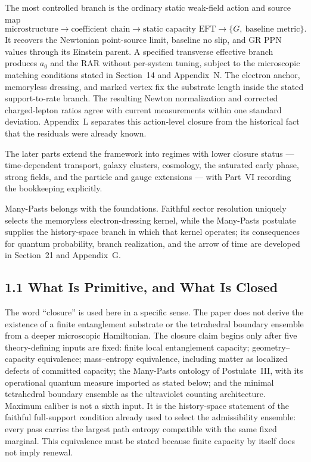 \documentclass[11pt]{article}
\begin{document}
The most controlled branch is the ordinary static weak-field action and source map
\[
\text{microstructure} \longrightarrow \text{coefficient chain} \longrightarrow \text{static capacity EFT} \longrightarrow \{G,\ \text{baseline metric}\}.
\]
It recovers the Newtonian point-source limit, baseline no slip, and GR PPN values through its Einstein parent. A specified transverse effective branch produces $a_0$ and the RAR without per-system tuning, subject to the microscopic matching conditions stated in Section~14 and Appendix~N. The electron anchor, memoryless dressing, and marked vertex fix the substrate length inside the stated support-to-rate branch. The resulting Newton normalization and corrected charged-lepton ratios agree with current measurements within one standard deviation. Appendix~L separates this action-level closure from the historical fact that the residuals were already known.

The later parts extend the framework into regimes with lower closure status --- time-dependent transport, galaxy clusters, cosmology, the saturated early phase, strong fields, and the particle and gauge extensions --- with Part~VI recording the bookkeeping explicitly.

Many-Pasts belongs with the foundations. Faithful sector resolution uniquely selects the memoryless electron-dressing kernel, while the Many-Pasts postulate supplies the history-space branch in which that kernel operates; its consequences for quantum probability, branch realization, and the arrow of time are developed in Section~21 and Appendix~G.

\subsection{1.1 What Is Primitive, and What Is Closed}

The word ``closure'' is used here in a specific sense. The paper does not derive the existence of a finite entanglement substrate or the tetrahedral boundary ensemble from a deeper microscopic Hamiltonian. The closure claim begins only after five theory-defining inputs are fixed: finite local entanglement capacity; geometry--capacity equivalence; mass--entropy equivalence, including matter as localized defects of committed capacity; the Many-Pasts ontology of Postulate~III, with its operational quantum measure imported as stated below; and the minimal tetrahedral boundary ensemble as the ultraviolet counting architecture. Maximum caliber is not a sixth input. It is the history-space statement of the faithful full-support condition already used to select the admissibility ensemble: every pass carries the largest path entropy compatible with the same fixed marginal. This equivalence must be stated because finite capacity by itself does not imply renewal.
\end{document}
